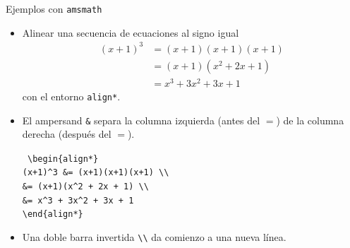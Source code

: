\documentclass[12pt]{beamer}
\begin{document}
\begin{frame}[fragile]{Ejemplos con \texttt{\color{green}amsmath}}
  \footnotesize{
  \begin{itemize}
    \item<1-> Alinear una secuencia de ecuaciones al signo igual
      \begin{align*}
        (x+1)^3 &= (x+1)(x+1)(x+1) \\
        &= (x+1)(x^2 + 2x + 1) \\
        &= x^3 + 3x^2 + 3x + 1
      \end{align*}
      con el entorno \texttt{align*}.
    \item<2-> El ampersand \texttt{\&} separa la columna izquierda (antes del $=$) de la columna derecha (después del $=$).
    \begin{center}
    \begin{minipage}{0.55\textwidth}
    \begin{block}{}
\texttt{\color{blue}
\textbackslash begin\{align*\}\\
(x+1)\texttt{\^}3 \&= (x+1)(x+1)(x+1) \textbackslash\textbackslash\\
\&= (x+1)(x\texttt{\^}2 + 2x + 1) \textbackslash\textbackslash\\
\&= x\texttt{\^}3 + 3x\texttt{\^}2 + 3x + 1\\
\textbackslash end\{align*\}}  
    \end{block}     
  \end{minipage}  
\end{center}
     \item<3-> Una doble barra invertida
       \texttt{\textbackslash\textbackslash} da comienzo a una nueva línea.     
\end{itemize}}
\end{frame}
\end{document}
